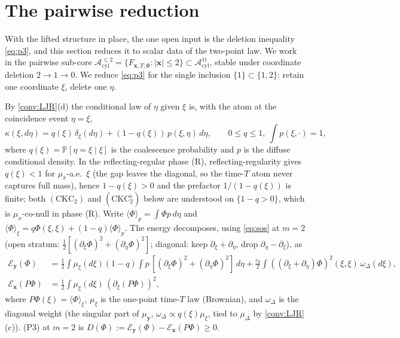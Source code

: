\documentclass[reqno,final,11pt]{amsart}
\theoremstyle{plain}
\theoremstyle{definition}
\theoremstyle{remark}
\newcommand{\Prob}{\mathbb P}
\newcommand{\cA}{\mathcal A}
\newcommand{\cE}{\mathcal E}
\newcommand{\Aone}{\cA^{\mathrm{1t}}_{\mathrm{cyl}}}
\newcommand{\Apair}{\cA^{\le 2}_{\mathrm{cyl}}}
\newcommand{\muD}{\mu_{\Delta}}
\newcommand{\cth}{c_{\theta}}
\begin{document}
\section{The pairwise reduction}\label{sec:reduction}

With the lifted structure in place, the one open input is the deletion
inequality \eqref{eq:p3}, and this section reduces it to scalar data of the
two-point law. We work in the pairwise sub-core
$\Apair=\{F_{\mathbf x,T,\Phi}:|\mathbf x|\le2\}\subset\Aone$, stable under
coordinate deletion $2\to1\to0$. We reduce \eqref{eq:p3} for the single
inclusion $\{1\}\subset\{1,2\}$: retain one coordinate $\xi$, delete one
$\eta$.

By \cref{conv:LJR}(d) the conditional law of $\eta$ given $\xi$ is, with the
atom at the coincidence event $\eta=\xi$,
\begin{equation}\label{eq:kernel}
  \kappa(\xi,d\eta)=q(\xi)\,\delta_\xi(d\eta)+(1-q(\xi))\,p(\xi,\eta)\,d\eta,
  \qquad 0\le q\le1,\ \textstyle\int p(\xi,\cdot)=1,
\end{equation}
where $q(\xi)=\Prob[\eta=\xi\mid\xi]$ is the coalescence probability and
$p$ is the diffuse conditional density. In the reflecting-regular phase (R),
reflecting-regularity gives $q(\xi)<1$ for $\mu_x$-a.e.\ $\xi$ (the gap leaves
the diagonal, so the time-$T$ atom never captures full mass), hence
$1-q(\xi)>0$ and the prefactor $1/(1-q(\xi))$ is finite; both
$(\mathrm{CKC}_2)$ and $(\mathrm{CKC}_2^{\flat})$ below are understood on
$\{1-q>0\}$, which is $\mu_x$-co-null in phase (R). Write
$\langle\Phi\rangle_p=\int\Phi p\,d\eta$ and
$\langle\Phi\rangle_\xi=q\Phi(\xi,\xi)+(1-q)\langle\Phi\rangle_p$. The
energy decomposes, using \eqref{eq:sos} at $m=2$ (open stratum:
$\tfrac12[(\partial_\xi\Phi)^2+(\partial_\eta\Phi)^2]$; diagonal: keep
$\partial_\xi+\partial_\eta$, drop $\partial_\eta-\partial_\xi$), as
\begin{align}\label{eq:Ey}
  \cE_{\mathbf y}(\Phi)
  &=\tfrac12\!\int\!\mu_\xi(d\xi)(1-q)\!\int p\,[(\partial_\xi\Phi)^2+(\partial_\eta\Phi)^2]\,d\eta
   +\tfrac{\cth}{2}\!\int\!((\partial_\xi+\partial_\eta)\Phi)^2(\xi,\xi)\,\omega_\Delta(d\xi),\\
  \label{eq:Ex}
  \cE_{\mathbf x}(P\Phi)&=\tfrac12\!\int\!\mu_\xi(d\xi)\,(\partial_\xi(P\Phi))^2,
\end{align}
where $P\Phi(\xi)=\langle\Phi\rangle_\xi$, $\mu_\xi$ is the one-point
time-$T$ law (Brownian), and $\omega_\Delta$ is the diagonal weight (the
singular part of $\mu_{\mathbf y}$, $\omega_\Delta\propto q(\xi)\mu_\xi$,
tied to $\muD$ by \cref{conv:LJR}(c)). (P3) at $m=2$ is
$D(\Phi):=\cE_{\mathbf y}(\Phi)-\cE_{\mathbf x}(P\Phi)\ge0$.
\end{document}
